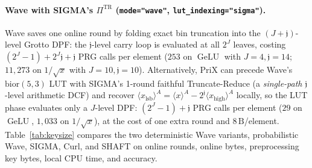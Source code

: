 \documentclass[11pt]{article}
\newcommand{\shareA}[1]{\langle #1 \rangle^{A}}
\begin{document}
\paragraph{Wave with SIGMA's $\Pi^{\text{TR}}$ (\texttt{mode="wave"}, \texttt{lut\_indexing="sigma"}).} Wave saves one online round by folding exact bin truncation into the $(J+\mathfrak{j})$-level Grotto DPF: the $\mathfrak{j}$-level carry loop is evaluated at all $2^J$ leaves, costing $(2^J-1) + 2^J\mathfrak{j} + \mathfrak{j}$ PRG calls per element ($253$ on $\operatorname{GeLU}$ with $J=4,\mathfrak{j}=14$; $11{,}273$ on $1/\sqrt{x}$ with $J=10,\mathfrak{j}=10$). Alternatively, PriX can precede Wave's $\text{bior}(5,3)$ LUT with SIGMA's 1-round faithful Truncate-Reduce (a \emph{single-path} $\mathfrak{j}$-level arithmetic DCF) and recover $\shareA{x_{\text{lsb}}} = \shareA{x} - 2^{\mathfrak{j}}\shareA{x_{\text{high}}}$ locally, so the LUT phase evaluates only a $J$-level DPF: $(2^J-1)+\mathfrak{j}$ PRG calls per element ($29$ on $\operatorname{GeLU}$, $1{,}033$ on $1/\sqrt{x}$), at the cost of one extra round and $8\,\text{B}$/element. Table~\ref{tab:keysize} compares the two deterministic Wave variants, probabilistic Wave, SIGMA, Curl, and SHAFT on online rounds, online bytes, preprocessing key bytes, local CPU time, and accuracy.

\begin{table}[t]
\centering
\caption{\textbf{Online vs.\ preprocessing cost and accuracy of PriX's default preset, Wave (two deterministic truncations and the probabilistic one), SIGMA, Curl, and SHAFT} in PriX (2 parties, CPU, $f=16$, simulated dealer, after the input-range fixes of Section~\ref{sec:range}). Online bytes and key bytes are per party; key bytes count seed correction words at $\lambda=128$. Primitives use $N=1000$; model rows extrapolate one block to all layers; Block MAE is the error of one Transformer block against float64.}
\label{tab:keysize}
\vspace{2pt}
\footnotesize
{}
\end{table}
\end{document}
